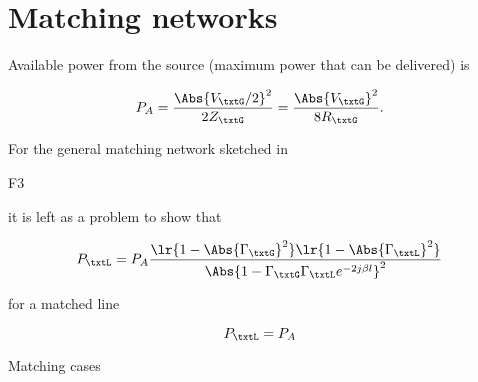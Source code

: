 %
%

\section{Matching networks}

Available power from the source (maximum power that can be delivered) is

\begin{dmath}\label{eqn:uwavesDeck6LCmatchingCore:20}
P_A 
= \frac{\Abs{V_\txtG/2}^2}{2 Z_\txtG}
= \frac{\Abs{V_\txtG}^2}{8 R_\txtG}.
\end{dmath}

For the general matching network sketched in

F3

it is left as a problem to show that

\begin{dmath}\label{eqn:uwavesDeck6LCmatchingCore:40}
P_\txtL = P_A \frac{ 
\lr{ 1 - \Abs{\Gamma_\txtG}^2 }
\lr{ 1 - \Abs{\Gamma_\txtL}^2 } }
{
\Abs{ 1 - \Gamma_\txtG \Gamma_\txtL e^{-2 j \beta l } }^2
}
\end{dmath}

for a matched line 

\begin{dmath}\label{eqn:uwavesDeck6LCmatchingCore:60}
P_\txtL = P_A
\end{dmath}

Matching cases


